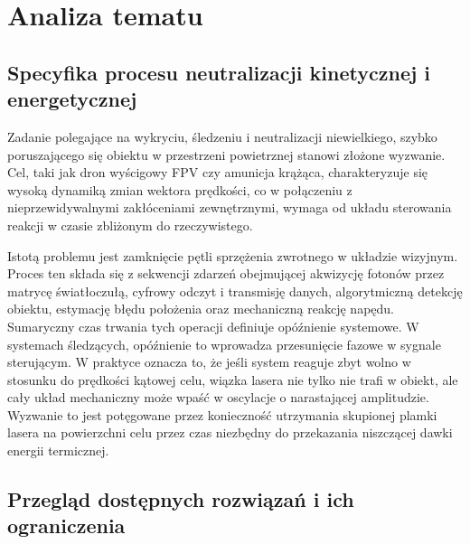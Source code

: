 \documentclass[a4paper,twoside,12pt]{book}
\begin{document}
\chapter{Analiza tematu}  %
% 



\section{Specyfika procesu neutralizacji kinetycznej i energetycznej}

Zadanie polegające na wykryciu, śledzeniu i neutralizacji niewielkiego, szybko poruszającego się obiektu w przestrzeni powietrznej stanowi złożone wyzwanie. Cel, taki jak dron wyścigowy FPV czy amunicja krążąca, charakteryzuje się wysoką dynamiką zmian wektora prędkości, co w połączeniu z nieprzewidywalnymi zakłóceniami zewnętrznymi, wymaga od układu sterowania reakcji w czasie zbliżonym do rzeczywistego.

Istotą problemu jest zamknięcie pętli sprzężenia zwrotnego w układzie wizyjnym. Proces ten składa się z sekwencji zdarzeń obejmującej akwizycję fotonów przez matrycę światłoczułą, cyfrowy odczyt i transmisję danych, algorytmiczną detekcję obiektu, estymację błędu położenia oraz mechaniczną reakcję napędu. Sumaryczny czas trwania tych operacji definiuje opóźnienie systemowe. W systemach śledzących, opóźnienie to wprowadza przesunięcie fazowe w sygnale sterującym. W praktyce oznacza to, że jeśli system reaguje zbyt wolno w stosunku do prędkości kątowej celu, wiązka lasera nie tylko nie trafi w obiekt, ale cały układ mechaniczny może wpaść w oscylacje o narastającej amplitudzie. Wyzwanie to jest potęgowane przez konieczność utrzymania skupionej plamki lasera na powierzchni celu przez czas niezbędny do przekazania niszczącej dawki energii termicznej.

\newpage

\section{Przegląd dostępnych rozwiązań i ich ograniczenia}
\end{document}
